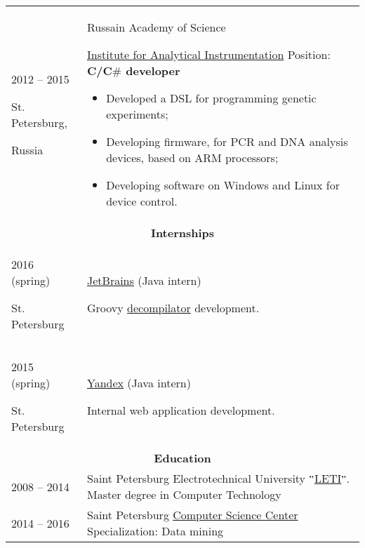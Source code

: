 \documentclass{article}
\begin{document}
\begin{longtable}{p{0.00in}p{0.00in}p{0.0in}p{0.00in}p{0.00in}}
\multicolumn{2}{p{\dimexpr1.00in+2\tabcolsep\relax}}{2012 -- 2015 \par St. Petersburg,\par Russia} &
\multicolumn{3}{p{\dimexpr5.85in+4\tabcolsep\relax}}{Russain Academy of Science\par \href{http://iairas.ru/en/}{Institute for Analytical Instrumentation}
Position: \textbf{C/C$\#$ developer} \par
\begin{itemize}
    \item Developed a DSL for programming genetic experiments;
    \item Developing firmware, for PCR and DNA analysis devices, based on ARM processors;
    \item Developing software on Windows and Linux for device control.
\end{itemize}
} \\

\multicolumn{5}{c}{\textbf{Internships}} \\

\multicolumn{2}{p{\dimexpr1.00in+2\tabcolsep\relax}}{2016 (spring) \par St. Petersburg} &
\multicolumn{3}{p{\dimexpr5.85in+4\tabcolsep\relax}}{\href{https://www.jetbrains.com/}{JetBrains} (Java intern) \par
    Groovy \href{https://github.com/dehasi/groovy-dc}{decompilator} development.
} \\

\multicolumn{2}{p{\dimexpr1.00in+2\tabcolsep\relax}}{2015 (spring) \par St. Petersburg} &
\multicolumn{3}{p{\dimexpr5.85in+4\tabcolsep\relax}}{\href{https://yandex.com/company/}{Yandex} (Java intern) \par
    Internal web application development.
} \\

\multicolumn{5}{c}{ \textbf{Education}} \\

\multicolumn{2}{p{\dimexpr1.00in+2\tabcolsep\relax}}{2008 -- 2014} &
\multicolumn{3}{p{\dimexpr5.85in+4\tabcolsep\relax}}{Saint Petersburg Electrotechnical
   University $"$\href{https://etu.ru/en/university/}{LETI}$"$. Master degree in Computer Technology
} \\

\multicolumn{2}{p{\dimexpr1.00in+2\tabcolsep\relax}}{2014 -- 2016} &
\multicolumn{3}{p{\dimexpr5.85in+4\tabcolsep\relax}}{Saint Petersburg
    \href{https://compscicenter.ru/students/714/}{Computer Science Center} Specialization: Data mining
} \\


\end{longtable}
\end{document}
